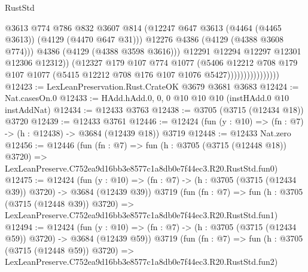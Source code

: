 \begin{lexlean}{RustStd}
\begin{coremodule}
                                      @3613
                                      @774
                                      @786
                                      @832
                                      @3607
                                      @814
                                      (@12247
                                        @647
                                        @3613
                                        (@4464 (@4465 @3613))
                                        (@4129 (@4470 @647 @31)))
                                      @12276
                                      @4386
                                      (@4129 (@4388 @3608 @774)))
                                    @4386
                                    (@4129 (@4388 @3598 @3616)))
                                  @12291
                                  @12294
                                  @12297
                                  @12301
                                  @12306
                                  @12312))
                              (@12327
                                @179
                                @107
                                @774
                                @1077
                                (@5406
                                  @12212
                                  @708
                                  @179
                                  @107
                                  @1077
                                  (@5415 @12212 @708 @176 @107 @1076 @5427))))))))))))))))
@12423 := LexLeanPreservation.Rust.CrateOK @3679 @3681 @3683
@12424 := Nat.casesOn.{0}
@12433 := HAdd.hAdd.{0, 0, 0} @10 @10 @10 (instHAdd.{0} @10 instAddNat)
@12434 := @12433 @3763
@12438 := @3705 (@3715 (@12434 @18)) @3720
@12439 := @12433 @3761
@12446 := @12424 (fun (y : @10) => (fn : @7) -> (h : @12438) -> @3684 (@12439 @18)) @3719
@12448 := @12433 Nat.zero
@12456 := @12446
    (fun (fn : @7) =>
    fun (h : @3705 (@3715 (@12448 @18)) @3720) =>
    LexLeanPreserve.C752ea9d16bb3e8577c1a8db0e7f44ec3.R20.RustStd.fun0)
@12475 := @12424
    (fun (y : @10) => (fn : @7) -> (h : @3705 (@3715 (@12434 @39)) @3720) -> @3684 (@12439 @39))
    @3719
    (fun (fn : @7) =>
    fun (h : @3705 (@3715 (@12448 @39)) @3720) =>
    LexLeanPreserve.C752ea9d16bb3e8577c1a8db0e7f44ec3.R20.RustStd.fun1)
@12494 := @12424
    (fun (y : @10) => (fn : @7) -> (h : @3705 (@3715 (@12434 @59)) @3720) -> @3684 (@12439 @59))
    @3719
    (fun (fn : @7) =>
    fun (h : @3705 (@3715 (@12448 @59)) @3720) =>
    LexLeanPreserve.C752ea9d16bb3e8577c1a8db0e7f44ec3.R20.RustStd.fun2)

\end{coremodule}
\end{lexlean}
